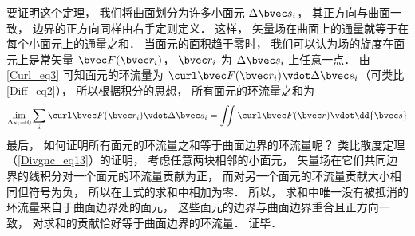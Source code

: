 要证明这个定理， 我们将曲面划分为许多小面元 $\Delta \bvec s_i$， 其正方向与曲面一致， 边界的正方向同样由右手定则定义． 这样， 矢量场在曲面上的通量就等于在每个小面元上的通量之和． 当面元的面积趋于零时， 我们可以认为场的旋度在面元上是常矢量 $\bvec F(\bvec r_i)$， $\bvec r_i$ 为 $\Delta \bvec s_i$ 上任意一点． 由\autoref{Curl_eq3} 可知面元的环流量为 $\curl\bvec F(\bvec r_i) \vdot \Delta \bvec s_i$（可类比\autoref{Diff_eq2}）， 所以根据积分的思想， 所有面元的环流量之和为
\begin{equation}
\lim_{\Delta s_i \to 0}\sum_i \curl\bvec F(\bvec r_i) \vdot \Delta \bvec s_i = \iint \curl\bvec F(\bvec r) \vdot \dd{\bvec s}
\end{equation}
最后， 如何证明所有面元的环流量之和等于曲面边界的环流量呢？ 类比散度定理（\autoref{Divgnc_eq13}）的证明， 考虑任意两块相邻的小面元， 矢量场在它们共同边界的线积分对一个面元的环流量贡献为正， 而对另一个面元的环流量贡献大小相同但符号为负， 所以在上式的求和中相加为零． 所以， 求和中唯一没有被抵消的环流量来自于曲面边界处的面元， 这些面元的边界与曲面边界重合且正方向一致， 对求和的贡献恰好等于曲面边界的环流量． 证毕．
